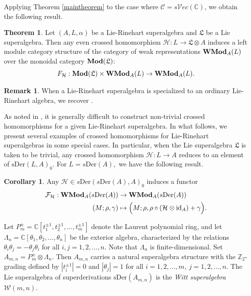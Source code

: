 \documentclass[11pt]{amsart}
\newcommand{\bbC}{\mathbb{C}}
\newcommand{\bbZ}{\mathbb{Z}}
\newcommand{\calC}{\mathcal{C}}
\newcommand{\id}{\mathrm{id}}
\theoremstyle{definition}
\newtheorem{theor}[theo]{Theorem}
\newtheorem{coro}[theo]{Corollary}
\newtheorem{rmk}[theo]{Remark}
\numberwithin{equation}{section}
\begin{document}
Applying Theorem \ref{maintheorem} to the case where $\calC=s\mathcal{V}ec(\bbC)$,  we obtain the following result. 
\begin{theor}\label{superver}
Let $(A,L,\alpha)$ be a Lie-Rinehart superalgebra and $\mathfrak{L}$ be a Lie superalgebra. Then any even crossed homomorphism $\mathcal{H}:L\rightarrow \mathfrak{L}\otimes A$ induces a left module category structure of the category of weak representations ${\bf WMod}_A(L)$ over the monoidal category ${\bf Mod}(\mathfrak{L})$:
\[F_{\mathcal{H}}: {\bf Mod}(\mathfrak{L}) \times {\bf WMod}_A(L) \rightarrow {\bf WMod}_A(L).   \]
\end{theor}
		
\begin{rmk}
When a Lie-Rinehart superalgebra is specialized to an ordinary Lie-Rinehart algebra, we recover   \cite[Theorem $3.26$]{PSTZ23}.
\end{rmk}
		
As noted in \cite{PSTZ23}, it is generally difficult to construct non-trivial crossed homomorphisms for a given Lie-Rinehart superalgebra. In what follows, we present several examples of crossed homomorphisms for Lie-Rinehart superalgebras in some special cases.
In particular, when the Lie superalgebra $\mathfrak{L}$ is taken to be  trivial, any crossed homomorphism $\mathcal{H}: L \to A$ reduces to an element of $\mathrm{sDer}(L,A)_0$. 
For $L=s\mathrm{Der}(A),$ we have the following result.
\begin{coro}
Any $\mathcal{H} \in s\mathrm{Der}(s\mathrm{Der}(A),A)_0$ induces a functor 
\begin{align*}
\mathcal{F}_{\mathcal{H}}: {\bf WMod}_A(s\mathrm{Der}(A)) &\to {\bf WMod}_A(s\mathrm{Der}(A))\\
(M;\rho,\gamma) & \mapsto \Big(M;\rho, \rho \circ (\mathcal{H}\otimes \id_A) +\gamma \Big).
\end{align*} 
\end{coro}
Let $P_m^{\pm}=\bbC[t_1^{\pm 1},t_2^{\pm 1},\dots,t_m^{\pm 1}]$ denote the Laurent polynomial ring, and let $\Lambda_n=\bbC[\theta_1, \theta_2,\dots, \theta_n]$ be the exterior algebra, characterized by the relations $\theta_i\theta_j=-\theta_j \theta_i$ for all $ i,j=1,2,\dots,n$. Note that $\Lambda_n$ is finite-dimensional. Set $A_{m,n}= P_m^{\pm}\otimes \Lambda_n$. Then $A_{m,n}$ carries a natural superalgebra structure with the $\bbZ_2$-grading defined by  $|t_i^{\pm 1}|=0 $ and $ |\theta_j|=1 $ for all $  i=1,2,\dots,m,\ j=1,2,\dots,n.$ The Lie superalgebra of superderivations $\mathrm{sDer}(A_{m,n})$ is the \emph{Witt superalgebra} $\mathcal{W}(m,n ).$  
		
\end{document}
